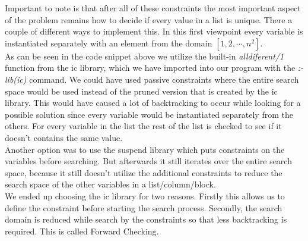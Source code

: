 Important to note is that after all of these constraints the most important aspect of the problem remains how to decide if every value in a list is unique. 
There a couple of different ways to implement this.
In this first viewpoint every variable is instantiated separately with an element from the domain $[1,2,\cdots,n^{2}]$. \\

As can be seen in the code snippet above we utilize the built-in \textsl{alldiferent/1} function from the ic library, which we have imported into our program with the \textsl{:- lib(ic)} command.
We could have used passive constraints where the entire search space would be used instead of the pruned version that is created by the ic library.
This would have caused a lot of backtracking to occur while looking for a possible solution since every variable would be instantiated separately from the others.
For every variable in the list the rest of the list is checked to see if it doesn't contains the same value.\\

Another option was to use the suspend library which puts constraints on the variables before searching.
But afterwards it still iterates over the entire search space, because it still doesn't utilize the additional constraints to reduce the search space of the other variables in a list/column/block.\\

We ended up choosing the ic library for two reasons.
Firstly this allows us to define the constraint before starting the search process.
Secondly, the search domain is reduced while search by the constraints so that less backtracking is required.
This is called Forward Checking. \\

